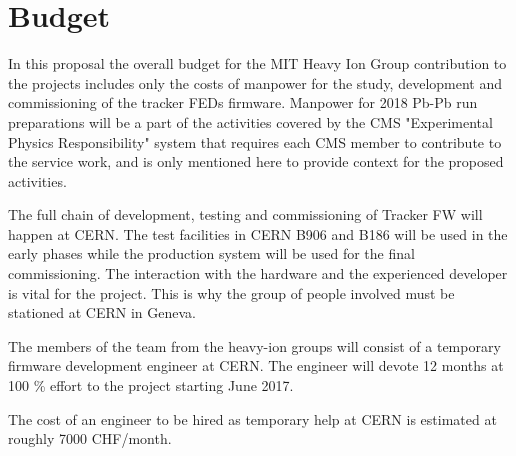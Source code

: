 \section{Budget}
\label{sec:funding}

In this proposal the overall budget for the MIT Heavy Ion Group contribution to the projects includes only the costs of manpower for the study, development and commissioning of the tracker FEDs firmware. Manpower for 2018 Pb-Pb run preparations will be a part of the activities covered by the CMS "Experimental Physics Responsibility" system that requires each CMS member to contribute to the service work, and is only mentioned here to provide context for the proposed activities. 

The full chain of development, testing and commissioning of Tracker FW will happen at CERN. The test facilities in CERN B906 and B186 will be used in the early phases while the production system will be used for the final commissioning. The interaction with the hardware and the experienced developer is vital for the project. This is why the group of people involved must be stationed at CERN in Geneva.

The members of the team from the heavy-ion groups will consist of a temporary firmware development engineer at CERN. The engineer will devote 12 months at 100 \% effort to the project starting June 2017. 
 
The cost of an engineer to be hired as temporary help at CERN is estimated at roughly 7000 CHF/month. 


% 
